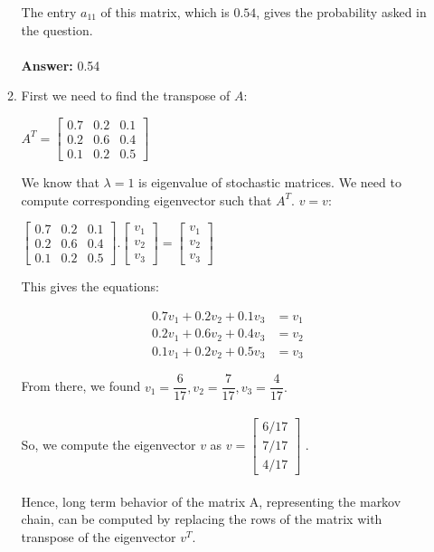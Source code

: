 \documentclass[12pt,a4paper, margin=1in]{article}
\begin{document}
\begin{enumerate}
\begin{enumerate}
The entry $a_{11}$ of this matrix, which is $0.54$, gives the probability asked in the question. \\\\
\textbf{Answer: } 0.54


            \item First we need to find the transpose of $A$:
\begin{center}
$A^T=
\begin{bmatrix}
0.7 & 0.2 & 0.1 \\
0.2 & 0.6 & 0.4 \\
0.1 & 0.2 & 0.5
\end{bmatrix}
$ 
\end{center}

We know that $\lambda = 1$ is eigenvalue of stochastic matrices. We need to compute corresponding eigenvector such that $A^T . $ $ v = v$: 

\begin{center}
$
\begin{bmatrix}
0.7 & 0.2 & 0.1 \\
0.2 & 0.6 & 0.4 \\
0.1 & 0.2 & 0.5
\end{bmatrix}
 . 
\begin{bmatrix}
    v_1 \\
    v_2 \\
    v_3
\end{bmatrix} = 
\begin{bmatrix}
    v_1 \\
    v_2 \\
    v_3
\end{bmatrix}$ 
\end{center}
This gives the equations:

\begin{center}
\begin{equation*} \label{eq1}
\begin{split}
        0.7 v_1 + 0.2 v_2 + 0.1 v_3 & = v_1 \\
        0.2 v_1 + 0.6 v_2 + 0.4 v_3 & = v_2 \\
        0.1 v_1 + 0.2 v_2 + 0.5 v_3 & = v_3 
\end{split}
\end{equation*}    
\end{center}

From there, we found $v_1 = \dfrac{6}{17}, v_2 = \dfrac{7}{17}, v_3= \dfrac{4}{17}.$  \\ \\
So, we compute the eigenvector $v$ as 
$v = \begin{bmatrix}
    6 / 17 \\
    7 / 17 \\
    4 / 17
\end{bmatrix}
$ . \\\\
Hence, long term behavior of the matrix A, representing the markov chain, can be computed by replacing the rows of the matrix with transpose of the eigenvector $v^T$. 


\end{enumerate}
\end{enumerate}
\end{document}
